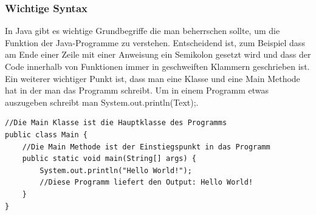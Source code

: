 \subsubsection{Wichtige Syntax}
In Java gibt es wichtige Grundbegriffe die man beherrschen sollte, um die Funktion der Java-Programme zu verstehen. Entscheidend ist, zum Beispiel dass am Ende einer Zeile mit einer Anweisung ein Semikolon gesetzt wird und dass der Code innerhalb von Funktionen immer in geschweiften Klammern geschrieben ist. Ein weiterer wichtiger Punkt ist, dass man eine Klasse und eine Main Methode hat in der man das Programm schreibt. Um in einem Programm etwas auszugeben schreibt man System.out.println(\dq Text\dq);\cite{programmieren_lernen_java_2021}.
\begin{verbatim}
//Die Main Klasse ist die Hauptklasse des Programms
public class Main {
    //Die Main Methode ist der Einstiegspunkt in das Programm
    public static void main(String[] args) {
        System.out.println("Hello World!");
        //Diese Programm liefert den Output: Hello World!
    }
}
\end{verbatim}

